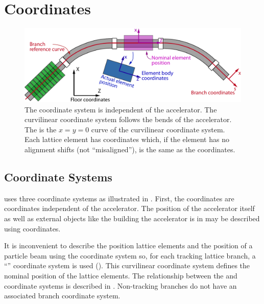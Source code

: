 \chapter{Coordinates}
\label{s:coords}

\begin{figure}[!hb]
  \centering
  \includegraphics[width=5.0in]{coordinates.pdf}
  \caption[The three coordinate system used by \accellat.]
{The  coordinate system
is independent of the accelerator.  The  curvilinear coordinate system follows the bends
of the accelerator. The  is the $x = y = 0$ curve of the curvilinear coordinate
system. Each lattice element has  coordinates which, if the element has no
alignment shifts (not ``misaligned''), is the same as the  coordinates.}
  \label{f:coords}
\end{figure}

\section{Coordinate Systems}
\label{s:coords}
\vspace*{-0.1in}

\accellat uses three coordinate systems as illustrated in . First, the 
coordinates are coordinates independent of the accelerator. The position of the accelerator 
itself as well as external objects like the building the accelerator is in  may be described 
using  coordinates.

It is inconvenient to describe the position lattice elements and the position of a 
particle beam using the  coordinate system so, for each tracking lattice branch,
a ``'' coordinate system is used (). This curvilinear coordinate
system defines the nominal position of the lattice elements. The relationship between the
 and  coordinate systems is described in . Non-tracking branches
do not have an associated branch coordinate system.


